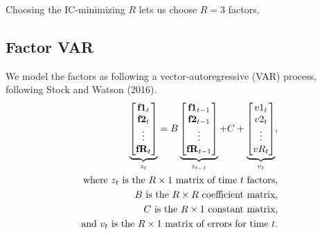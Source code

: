 \documentclass[11pt, letterpaper]{article}\usepackage[]{graphicx}\usepackage[]{color}
\newcommand{\vv}[1]{\textcolor{black}{\mathbf{#1}}}
\begin{document}
Choosing the IC-minimizing $R$ lets us choose $R = 3$ factors.





\subsection{Factor VAR}
We model the factors as following a vector-autoregressive (VAR) process, following Stock and Watson (2016).
\begin{align*}
\underbrace{\begin{bmatrix}
	\vv{f1}_{t}\\
	\vv{f2}_{t}\\
	\vdots \\
	\vv{fR}_{t}
\end{bmatrix}}_{z_t}
=
B
\underbrace{\begin{bmatrix}
	\vv{f1}_{t-1}\\
	\vv{f2}_{t-1}\\
	\vdots \\
	\vv{fR}_{t-1}
\end{bmatrix}}_{z_{t-1}}
+
C
+
\underbrace{\begin{bmatrix}
v1_t\\
v2_t\\
\vdots\\
vR_t
\end{bmatrix}}_{v_t},\\
\text{where $z_t$ is the $R \times 1$ matrix of time $t$ factors,}\\
\text{$B$ is the $R \times R$ coefficient matrix,}\\
\text{$C$ is the $R \times 1$ constant matrix,}\\
\text{and $v_t$ is the $R \times 1$ matrix of errors for time $t$.}
\end{align*}
\end{document}
